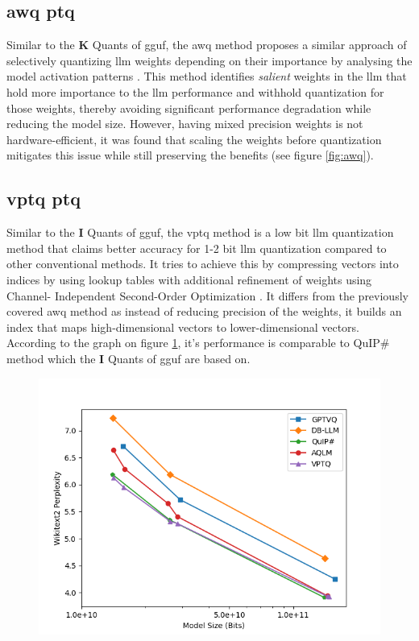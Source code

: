 \documentclass{ifacconf}
\begin{document}
	\subsection{\gls{awq} \gls{ptq}}
	
	Similar to the \textbf{K} Quants of \gls{gguf}, the \gls{awq} method proposes a similar approach of selectively quantizing \gls{llm} weights depending on their importance by analysing the model activation patterns \cite{lin2024awqactivationawareweightquantization}. This method identifies \textit{salient} weights in the \gls{llm} that hold more importance to the \gls{llm} performance and withhold quantization for those weights, thereby avoiding significant performance degradation while reducing the model size. However, having  mixed precision weights is not hardware-efficient, it was found that scaling the weights before quantization mitigates this issue while still preserving the benefits (see figure \ref{fig:awq}).
	
	\subsection{\gls{vptq} \gls{ptq}}
	
	Similar to the \textbf{I} Quants of \gls{gguf}, the \gls{vptq} method is a low bit \gls{llm} quantization method that claims better accuracy for 1-2 bit \gls{llm} quantization compared to other conventional methods. It tries to achieve this by compressing vectors into indices by using lookup tables with additional refinement of weights using Channel-
	Independent Second-Order Optimization \cite{liu2024vptqextremelowbitvector}. It differs from the previously covered \gls{awq} method as instead of reducing precision of the weights, it builds an index that maps high-dimensional vectors to lower-dimensional vectors. According to the graph on figure \ref{fig:vptq}, it's performance is comparable to QuIP\# method which the \textbf{I} Quants of \gls{gguf} are based on.
	
	\begin{figure}[h]
		\includegraphics[width=1.1\linewidth]{vptq}
		\label{fig:vptq}
	\end{figure}
	
\end{document}
